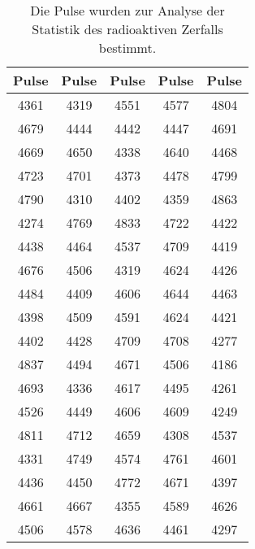 \begin{table}\caption{Die Pulse wurden zur Analyse der Statistik des radioaktiven Zerfalls bestimmt.}
\label{tabc}
\centering
{}
\begin{tabular}{c c c c c} 
\toprule
{Pulse} & {Pulse} & {Pulse} & {Pulse} & {Pulse}\\
\midrule
4361 & 4319 & 4551 & 4577 & 4804\\
4679 & 4444 & 4442 & 4447 & 4691\\
4669 & 4650 & 4338 & 4640 & 4468\\
4723 & 4701 & 4373 & 4478 & 4799\\
4790 & 4310 & 4402 & 4359 & 4863\\
4274 & 4769 & 4833 & 4722 & 4422\\
4438 & 4464 & 4537 & 4709 & 4419\\
4676 & 4506 & 4319 & 4624 & 4426\\
4484 & 4409 & 4606 & 4644 & 4463\\
4398 & 4509 & 4591 & 4624 & 4421\\
4402 & 4428 & 4709 & 4708 & 4277\\
4837 & 4494 & 4671 & 4506 & 4186\\
4693 & 4336 & 4617 & 4495 & 4261\\
4526 & 4449 & 4606 & 4609 & 4249\\
4811 & 4712 & 4659 & 4308 & 4537\\
4331 & 4749 & 4574 & 4761 & 4601\\
4436 & 4450 & 4772 & 4671 & 4397\\
4661 & 4667 & 4355 & 4589 & 4626\\
4506 & 4578 & 4636 & 4461 & 4297\\
\bottomrule
\end{tabular}\end{table}
